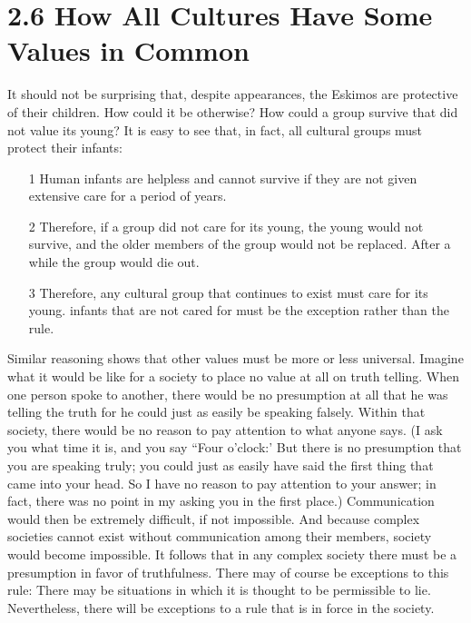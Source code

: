 \section{2.6 How All Cultures Have Some Values in Common} 
It  should  not  be  surprising  that,  despite  appearances,  the  Eskimos  are 
protective  of  their  children.  How  could  it  be  otherwise?  How  could  a 
group survive that did not value its young? It is easy to see that, in fact, 
all cultural groups must protect their infants: 
\begin{enumerate}
\item[1] Human  infants  are  helpless  and  cannot  survive  if  they are 
not given extensive care for a period of years. 
\item[2] Therefore,  if  a  group  did  not  care  for  its  young,  the  young 
would  not  survive,  and  the  older  members  of  the  group 
would  not  be  replaced.  After  a  while  the  group  would  die 
out. 
\item[3] Therefore,  any  cultural  group  that  continues  to  exist  must 
care for its young. infants that are not cared for must be the 
exception rather than the rule. 
\end{enumerate}
Similar reasoning shows that other values must be more or less 
universal. Imagine what it would be like for a society to place no value at 
all on truth telling. When one person spoke to another, there would be no 
presumption at all that he was telling the truth for he could just as easily 
be speaking falsely. Within that society, there would be no reason to pay 
attention  to  what  anyone  says.  (I  ask  you  what  time  it  is,  and  you  say 
``Four  o'clock:'  But  there  is  no  presumption  that  you  are  speaking  truly; 
you  could  just  as  easily  have  said  the  first  thing  that  came  into  your 
head. So I have no reason to pay attention to your answer; in fact, there 
was no point  in my asking you in the first place.) Communication would 
then  be  extremely  difficult,  if  not  impossible.  And  because  complex 
societies  cannot  exist  without  communication  among  their  members, 
society would become impossible. It follows that in any complex society 
there  must  be  a  presumption  in  favor  of  truthfulness.  There  may  of 
course be exceptions to  this rule: There may be  situations in which it is 
thought to be permissible to lie. Nevertheless, there will be exceptions to 
a rule that is in force in the society.
 
